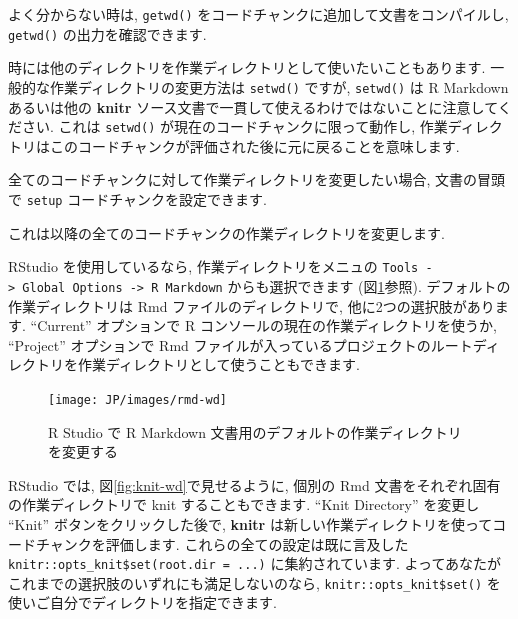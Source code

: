 \documentclass[
  11pt,
  lualatex,ja=standard,jafont=noto]{bxjsreport}
\newenvironment{Shaded}{\begin{snugshade}}{\end{snugshade}}
\newcommand{\InformationTok}[1]{\textcolor[rgb]{0.56,0.35,0.01}{\textbf{\textit{#1}}}}
\begin{document}
よく分からない時は, \texttt{getwd()} をコードチャンクに追加して文書をコンパイルし, \texttt{getwd()} の出力を確認できます.

時には他のディレクトリを作業ディレクトリとして使いたいこともあります. 一般的な作業ディレクトリの変更方法は \texttt{setwd()} ですが, \texttt{setwd()} は R Markdown あるいは他の \textbf{knitr} ソース文書で一貫して使えるわけではないことに注意してください. これは \texttt{setwd()} が現在のコードチャンクに限って動作し, 作業ディレクトリはこのコードチャンクが評価された後に元に戻ることを意味します.

全てのコードチャンクに対して作業ディレクトリを変更したい場合, 文書の冒頭で \texttt{setup} コードチャンクを設定できます.

\begin{Shaded}
\end{Shaded}

これは以降の全てのコードチャンクの作業ディレクトリを変更します.

RStudio を使用しているなら, 作業ディレクトリをメニュの \texttt{Tools -\textgreater{}\ Global\ Options\ -\textgreater{}\ R\ Markdown} からも選択できます (図\ref{fig:rmd-wd}参照). デフォルトの作業ディレクトリは Rmd ファイルのディレクトリで, 他に2つの選択肢があります. ``Current'' オプションで R コンソールの現在の作業ディレクトリを使うか, ``Project'' オプションで Rmd ファイルが入っているプロジェクトのルートディレクトリを作業ディレクトリとして使うこともできます.

\begin{figure}

{\centering \texttt{[image: JP/images/rmd-wd]} 

}

\caption{R Studio で R Markdown 文書用のデフォルトの作業ディレクトリを変更する}\label{fig:rmd-wd}
\end{figure}

RStudio では, 図\ref{fig:knit-wd}で見せるように, 個別の Rmd 文書をそれぞれ固有の作業ディレクトリで knit することもできます. ``Knit Directory'' を変更し ``Knit'' ボタンをクリックした後で, \textbf{knitr} は新しい作業ディレクトリを使ってコードチャンクを評価します. これらの全ての設定は既に言及した \texttt{knitr::opts\_knit\$set(root.dir = ...)} に集約されています. よってあなたがこれまでの選択肢のいずれにも満足しないのなら, \texttt{knitr::opts\_knit\$set()} を使いご自分でディレクトリを指定できます.
\end{document}

